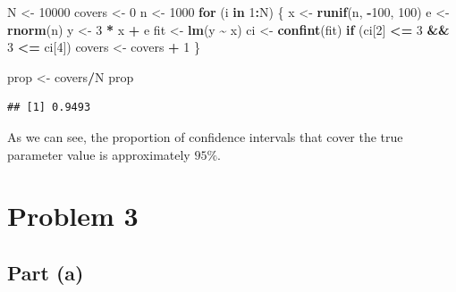 \documentclass[
  12pt,
]{paper}
\newenvironment{Shaded}{\begin{snugshade}}{\end{snugshade}}
\newcommand{\ControlFlowTok}[1]{\textcolor[rgb]{0.13,0.29,0.53}{\textbf{#1}}}
\newcommand{\DecValTok}[1]{\textcolor[rgb]{0.00,0.00,0.81}{#1}}
\newcommand{\FunctionTok}[1]{\textcolor[rgb]{0.13,0.29,0.53}{\textbf{#1}}}
\newcommand{\NormalTok}[1]{#1}
\newcommand{\OtherTok}[1]{\textcolor[rgb]{0.56,0.35,0.01}{#1}}
\newcommand{\SpecialCharTok}[1]{\textcolor[rgb]{0.81,0.36,0.00}{\textbf{#1}}}
\begin{document}
\begin{Shaded}
\begin{Highlighting}[]
\NormalTok{N }\OtherTok{\textless{}{-}} \DecValTok{10000}
\NormalTok{covers }\OtherTok{\textless{}{-}} \DecValTok{0}
\NormalTok{n }\OtherTok{\textless{}{-}} \DecValTok{1000}
\ControlFlowTok{for}\NormalTok{ (i }\ControlFlowTok{in} \DecValTok{1}\SpecialCharTok{:}\NormalTok{N) \{}
\NormalTok{    x }\OtherTok{\textless{}{-}} \FunctionTok{runif}\NormalTok{(n, }\SpecialCharTok{{-}}\DecValTok{100}\NormalTok{, }\DecValTok{100}\NormalTok{)}
\NormalTok{    e }\OtherTok{\textless{}{-}} \FunctionTok{rnorm}\NormalTok{(n)}
\NormalTok{    y }\OtherTok{\textless{}{-}} \DecValTok{3} \SpecialCharTok{*}\NormalTok{ x }\SpecialCharTok{+}\NormalTok{ e}
\NormalTok{    fit }\OtherTok{\textless{}{-}} \FunctionTok{lm}\NormalTok{(y }\SpecialCharTok{\textasciitilde{}}\NormalTok{ x)}
\NormalTok{    ci }\OtherTok{\textless{}{-}} \FunctionTok{confint}\NormalTok{(fit)}
    \ControlFlowTok{if}\NormalTok{ (ci[}\DecValTok{2}\NormalTok{] }\SpecialCharTok{\textless{}=} \DecValTok{3} \SpecialCharTok{\&\&} \DecValTok{3} \SpecialCharTok{\textless{}=}\NormalTok{ ci[}\DecValTok{4}\NormalTok{])}
\NormalTok{        covers }\OtherTok{\textless{}{-}}\NormalTok{ covers }\SpecialCharTok{+} \DecValTok{1}
\NormalTok{\}}

\NormalTok{prop }\OtherTok{\textless{}{-}}\NormalTok{ covers}\SpecialCharTok{/}\NormalTok{N}
\NormalTok{prop}
\end{Highlighting}
\end{Shaded}

\begin{verbatim}
## [1] 0.9493
\end{verbatim}

As we can see, the proportion of confidence intervals that cover the
true parameter value is approximately \(95\%\).

\hypertarget{problem-3}{%
\section{Problem 3}\label{problem-3}}


\hypertarget{part-a-1}{%
\subsection{Part (a)}\label{part-a-1}}
\end{document}
